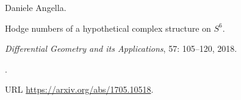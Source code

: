 Daniele Angella.

\newblock Hodge numbers of a hypothetical complex structure on {$S^6$}.

\newblock \emph{Differential Geometry and its Applications}, 57:
  105--120, 2018.

\newblock {}.

\newblock URL \url{https://arxiv.org/abs/1705.10518}.
